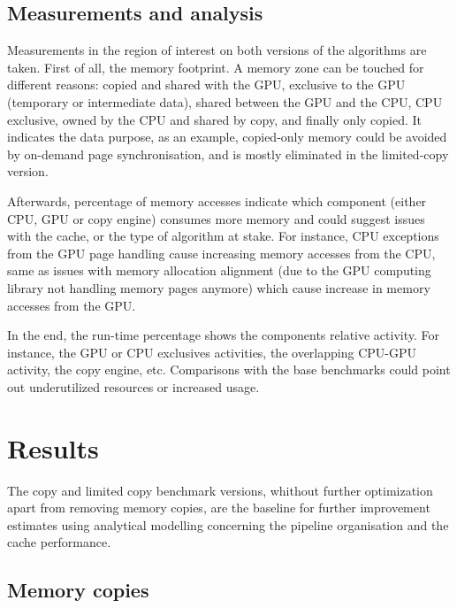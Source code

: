 \documentclass[11pt,twoside,a4paper]{article}
\begin{document}
\begin{multicols}{2}
\subsection{Measurements and analysis}

Measurements in the region of interest on both versions of the algorithms are
taken. First of all, the memory footprint. A memory zone can be touched for
different reasons: copied and shared with the GPU, exclusive to the GPU
(temporary or intermediate data), shared between the GPU and the CPU, CPU
exclusive, owned by the CPU and shared by copy, and finally only copied. It
indicates the data purpose, as an example, copied-only memory could be avoided by
on-demand page synchronisation, and is mostly eliminated in the limited-copy
version.

Afterwards, percentage of memory accesses indicate which component (either CPU,
GPU or copy engine) consumes more memory and could suggest issues with the
cache, or the type of algorithm at stake. For instance, CPU exceptions from the
GPU page handling cause increasing memory accesses from the CPU, same as
issues with memory allocation alignment (due to the GPU computing library not
handling memory pages anymore) which cause increase in memory accesses from
the GPU\@.

In the end, the run-time percentage shows the components relative activity. For
instance, the GPU or CPU exclusives activities, the overlapping CPU-GPU
activity, the copy engine, etc. Comparisons with the base benchmarks could
point out underutilized resources or increased usage.

\section{Results}

The copy and limited copy benchmark versions, whithout further optimization
apart from removing memory copies, are the baseline for further improvement
estimates using analytical modelling concerning the pipeline organisation and
the cache performance.

\subsection{Memory copies}


\end{multicols}
\end{document}
